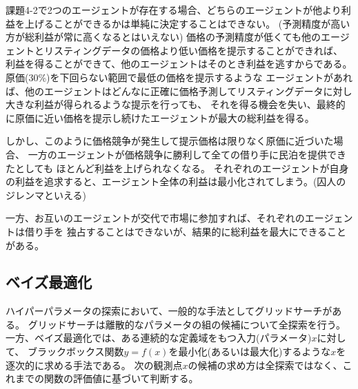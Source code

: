 \documentclass{jsarticle}
\begin{document}
課題4-2で2つのエージェントが存在する場合、どちらのエージェントが他より利益を上げることができるかは単純に決定することはできない。
(予測精度が高い方が総利益が常に高くなるとはいえない)
価格の予測精度が低くても他のエージェントとリスティングデータの価格より低い価格を提示することができれば、
利益を得ることができて、他のエージェントはそのとき利益を逃すからである。原価(30\%)を下回らない範囲で最低の価格を提示するような
エージェントがあれば、他のエージェントはどんなに正確に価格予測してリスティングデータに対し大きな利益が得られるような提示を行っても、
それを得る機会を失い、最終的に原価に近い価格を提示し続けたエージェントが最大の総利益を得る。

しかし、このように価格競争が発生して提示価格は限りなく原価に近づいた場合、
一方のエージェントが価格競争に勝利して全ての借り手に民泊を提供できたとしても
ほとんど利益を上げられなくなる。
それぞれのエージェントが自身の利益を追求すると、エージェント全体の利益は最小化されてしまう。(囚人のジレンマといえる)

一方、お互いのエージェントが交代で市場に参加すれば、それぞれのエージェントは借り手を
独占することはできないが、結果的に総利益を最大にできることがある。

\subsection{ベイズ最適化}
ハイパーパラメータの探索において、一般的な手法としてグリッドサーチがある。
グリッドサーチは離散的なパラメータの組の候補について全探索を行う。
一方、ベイズ最適化では、ある連続的な定義域をもつ入力(パラメータ)$x$に対して、
ブラックボックス関数$y = f(x)$を最小化(あるいは最大化)するような$x$を逐次的に求める手法である。
次の観測点$x$の候補の求め方は全探索ではなく、これまでの関数の評価値に基づいて判断する。
\end{document}
